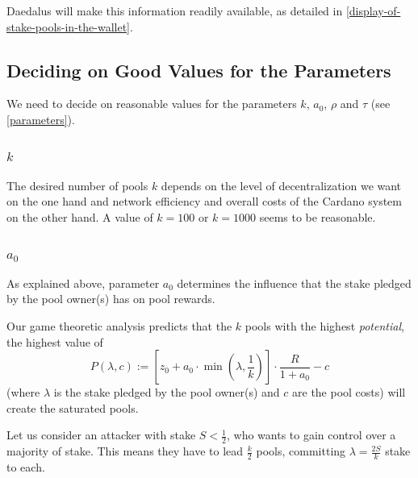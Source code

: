 \documentclass[11pt,a4paper,dvipsnames,twosided]{article}
\begin{document}
Daedalus will make this information readily available, as detailed in
\cref{display-of-stake-pools-in-the-wallet}.

\subsection{Deciding on Good Values for the Parameters}
\label{deciding-on-good-values-for-the-parameters}

We need to decide on reasonable values for the parameters \(k\),
\(a_0\), \(\rho\) and \(\tau\) (see \cref{parameters}).

\subsubsection{\texorpdfstring{\(k\)}{k}}

The desired number of pools \(k\) depends on the level of decentralization we
want on the one hand and network efficiency and overall costs of the Cardano
system on the other hand. A value of \(k=100\) or \(k=1000\) seems to be
reasonable.

\subsubsection{\texorpdfstring{\(a_0\)}{a\_0}}

As explained above, parameter \(a_0\) determines the influence that the stake
pledged by the pool owner(s) has on pool rewards.

Our game theoretic analysis predicts that the \(k\) pools with the
highest \emph{potential}, the highest value of \[
    P(\lambda,c):=\left[z_0+a_0\cdot\min\left(\lambda,\frac{1}{k}\right)\right]\cdot\frac{R}{1+a_0}-c
\] (where \(\lambda\) is the stake pledged by the pool owner(s) and \(c\)
are the pool costs) will create the saturated pools.

Let us consider an attacker with stake \(S < \frac{1}{2}\), who wants to
gain control over a majority of stake. This means they have to lead
\(\frac{k}{2}\) pools, committing \(\lambda=\frac{2S}{k}\) stake to
each.
\end{document}
